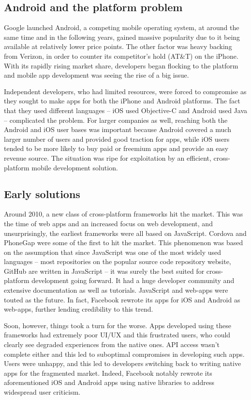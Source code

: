 \documentclass[12pt,a4paper]{article}
\begin{document}
	\subsection{Android and the platform problem}
	
	Google launched Android, a competing mobile operating system, at around the same time and in the following years, gained massive popularity due to it being available at relatively lower price points. The other factor was heavy backing from Verizon, in order to counter its competitor's hold (AT\&T) on the iPhone. With its rapidly rising market share, developers began flocking to the platform and mobile app development was seeing the rise of a big issue.
	
	Independent developers, who had limited resources, were forced to compromise as they sought to make apps for both the iPhone and Android platforms. The fact that they used different languages -- iOS used Objective-C and Android used Java -- complicated the problem. For larger companies as well, reaching both the Android and iOS user bases was important because Android covered a much larger number of users and provided good traction for apps, while iOS users tended to be more likely to buy paid or freemium apps and provide an easy revenue source.
	The situation was ripe for exploitation by an efficient, cross-platform mobile development solution.
	
	\subsection{Early solutions}
	
	Around 2010, a new class of cross-platform frameworks hit the market. This was the time of web apps and an increased focus on web development, and unsurprisingly, the earliest frameworks were all based on JavaScript. Cordova and PhoneGap were some of the first to hit the market. This phenomenon was based on the assumption that since JavaScript was one of the most widely used languages -- most repositories on the popular source code repository website, GitHub are written in JavaScript -- it was surely the best suited for cross-platform development going forward. It had a huge developer community and extensive documentation as well as tutorials. JavaScript and web-apps were touted as the future. In fact, Facebook rewrote its apps for iOS and Android as web-apps, further lending credibility to this trend.
	
	Soon, however, things took a turn for the worse. Apps developed using these frameworks had extremely poor UI/UX and this frustrated users, who could clearly see degraded experiences from the native ones. API access wasn't complete either and this led to suboptimal compromises in developing such apps. Users were unhappy, and this led to developers switching back to writing native apps for the fragmented market. Indeed, Facebook notably rewrote its aforementioned iOS and Android apps using native libraries to address widespread user criticism.
	
\end{document}
